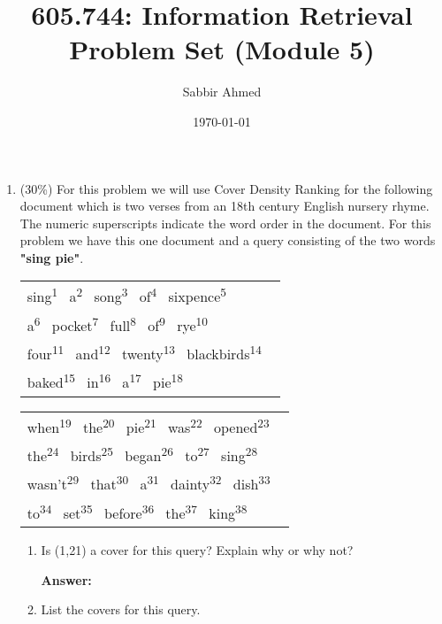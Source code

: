 \documentclass[11pt]{article}
\title{605.744: Information Retrieval \\ Problem Set (Module 5)}
\author{Sabbir Ahmed}
\date{\today}
\newcommand{\super}{\textsuperscript}
\begin{document}
\maketitle

    \begin{enumerate}
        \item (30\%) For this problem we will use Cover Density Ranking for the following document which is two verses from an 18th century English nursery rhyme. The numeric superscripts indicate the word order in the document. For this problem we have this one document and a query consisting of the two words \textbf{"sing pie"}.

        \begin{center}
            \begin{tabular}{l}
            sing\super{1} \ a\super{2} \ song\super{3} \ of\super{4} \ sixpence\super{5} \ \\
            a\super{6} \ pocket\super{7} \ full\super{8} \ of\super{9} \ rye\super{10} \ \\
            four\super{11} \ and\super{12} \ twenty\super{13} \ blackbirds\super{14} \ \\
            baked\super{15} \ in\super{16} \ a\super{17} \ pie\super{18}
            \end{tabular}
        \end{center}

        \begin{center}
            \begin{tabular}{l}
            when\super{19} \ the\super{20} \ pie\super{21} \ was\super{22} \ opened\super{23} \ \\
            the\super{24} \ birds\super{25} \ began\super{26} \ to\super{27} \ sing\super{28} \ \\
            wasn't\super{29} \ that\super{30} \ a\super{31} \ dainty\super{32} \ dish\super{33} \ \\
            to\super{34} \ set\super{35} \ before\super{36} \ the\super{37} \ king\super{38}
            \end{tabular}
        \end{center}

        \begin{enumerate}
            \item Is (1,21) a cover for this query? Explain why or why not?
            
            \textbf{Answer:}

            \item List the covers for this query.
            

\end{enumerate}
\end{enumerate}
\end{document}

